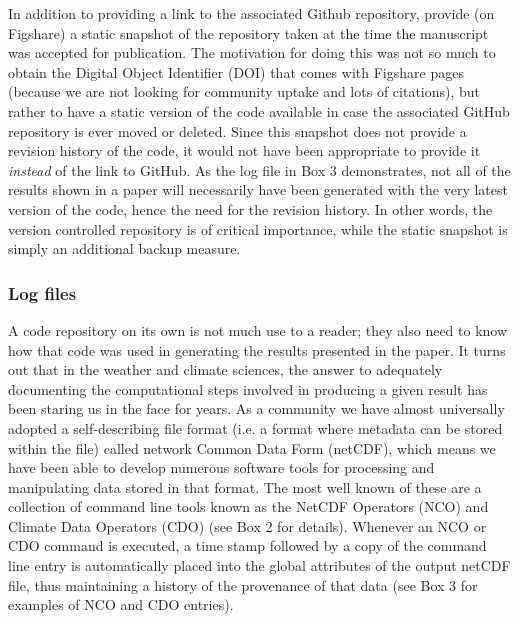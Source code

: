 In addition to providing a link to the associated Github repository, \citet{Irving2016} provide (on Figshare) a static snapshot of the repository taken at the time the manuscript was accepted for publication. The motivation for doing this was not so much to obtain the Digital Object Identifier (DOI) that comes with Figshare pages (because we are not looking for community uptake and lots of citations), but rather to have a static version of the code available in case the associated GitHub repository is ever moved or deleted. Since this snapshot does not provide a revision history of the code, it would not have been appropriate to provide it \textit{instead} of the link to GitHub. As the log file in Box 3 demonstrates, not all of the results shown in a paper will necessarily have been generated with the very latest version of the code, hence the need for the revision history. In other words, the version controlled repository is of critical importance, while the static snapshot is simply an additional backup measure.  

\subsubsection{Log files}\label{s:log_files}

A code repository on its own is not much use to a reader; they also need to know how that code was used in generating the results presented in the paper. It turns out that in the weather and climate sciences, the answer to adequately documenting the computational steps involved in producing a given result has been staring us in the face for years. As a community we have almost universally adopted a self-describing file format (i.e. a format where metadata can be stored within the file) called network Common Data Form (netCDF), which means we have been able to develop numerous software tools for processing and manipulating data stored in that format. The most well known of these are a collection of command line tools known as the NetCDF Operators (NCO) and Climate Data Operators (CDO) (see Box 2 for details). Whenever an NCO or CDO command is executed, a time stamp followed by a copy of the command line entry is automatically placed into the global attributes of the output netCDF file, thus maintaining a history of the provenance of that data (see Box 3 for examples of NCO and CDO entries).


